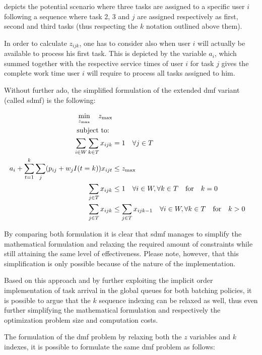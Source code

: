 \documentclass{seal_thesis}
\begin{document}
 depicts the potential scenario where three tasks are assigned to a specific user $i$ following a sequence where task 2, 3 and $j$ are assigned respectively as first, second and third tasks (thus respecting the $k$ notation outlined above them).

In order to calculate $z_{ijk}$, one has to consider also when user $i$ will actually be available to process his first task. This is depicted by the variable $a_i$, which summed together with the respective service times of user $i$ for task $j$ gives the complete work time user $i$ will require to process all tasks assigned to him.


Without further ado, the simplified formulation of the extended \gls{dmf} variant (called \gls{sdmf}) is the following:

\begin{align}
    \min_{z_{\text{max}}} \quad z_{\text{max}}\\
    \text{subject to: } \notag \\
    \sum_{i \in W} \sum_{k \in T} x_{ijk} &= 1 \quad \forall j \in T\\
    a_i + \sum_{t=1}^k \sum_j (p_{ij} + w_j I(t=k))x_{ijt} &\leq z_{\text{max}}\\
    \sum_{j \in T} x_{ijk} &\leq 1 \quad \forall i \in W, \forall k \in T \quad \text{for} \quad k=0\\
    \sum_{j \in T} x_{ijk} &\leq \sum_{j \in T} x_{ijk-1} \quad \forall i \in W, \forall k \in T \quad \text{for} \quad k>0
\end{align}

By comparing both formulation it is clear that \gls{sdmf} manages to simplify the mathematical formulation and relaxing the required amount of constraints while still attaining the same level of effectiveness. Please note, however, that this simplification is only possible because of the nature of the implementation.

Based on this approach and by further exploiting the implicit order implementation of task arrival in the global queues for both batching policies, it is possible to argue that the $k$ sequence indexing can be relaxed as well, thus even further simplifying the mathematical formulation and respectively the optimization problem size and computation costs.

The formulation of the \gls{dmf} problem by relaxing both the $z$ variables and $k$ indexes, it is possible to formulate the same \gls{dmf} problem as follows:
\end{document}
